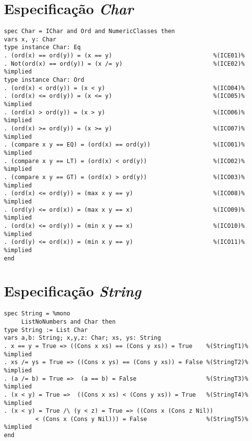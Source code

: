 \section{Especificação \textit{Char}}
\label{appendix:strictSpec:char}
\begin{Verbatim}
spec Char = IChar and Ord and NumericClasses then
vars x, y: Char
type instance Char: Eq
. (ord(x) == ord(y)) = (x == y)                             %(ICE01)%
. Not(ord(x) == ord(y)) = (x /= y)                          %(ICE02)% %implied
type instance Char: Ord
. (ord(x) < ord(y)) = (x < y)                               %(ICO04)%
. (ord(x) <= ord(y)) = (x <= y)                             %(ICO05)% %implied
. (ord(x) > ord(y)) = (x > y)                               %(ICO06)% %implied
. (ord(x) >= ord(y)) = (x >= y)                             %(ICO07)% %implied
. (compare x y == EQ) = (ord(x) == ord(y))                  %(ICO01)% %implied
. (compare x y == LT) = (ord(x) < ord(y))                   %(ICO02)% %implied
. (compare x y == GT) = (ord(x) > ord(y))                   %(ICO03)% %implied
. (ord(x) <= ord(y)) = (max x y == y)                       %(ICO08)% %implied
. (ord(y) <= ord(x)) = (max x y == x)                       %(ICO09)% %implied
. (ord(x) <= ord(y)) = (min x y == x)                       %(ICO10)% %implied
. (ord(y) <= ord(x)) = (min x y == y)                       %(ICO11)% %implied
end
\end{Verbatim}

\section{Especificação \textit{String}}
\label{appendix:strictSpec:string}
\begin{Verbatim}
spec String = %mono
     ListNoNumbers and Char then
type String := List Char
vars a,b: String; x,y,z: Char; xs, ys: String
. x == y = True => ((Cons x xs) == (Cons y xs)) = True    %(StringT1)% %implied
. xs /= ys = True => ((Cons x ys) == (Cons y xs)) = False %(StringT2)% %implied
. (a /= b) = True =>  (a == b) = False                    %(StringT3)% %implied
. (x < y) = True =>  ((Cons x xs) < (Cons y xs)) = True   %(StringT4)% %implied
. (x < y) = True /\ (y < z) = True => ((Cons x (Cons z Nil)) 
         < (Cons x (Cons y Nil))) = False                 %(StringT5)% %implied
end
\end{Verbatim}

